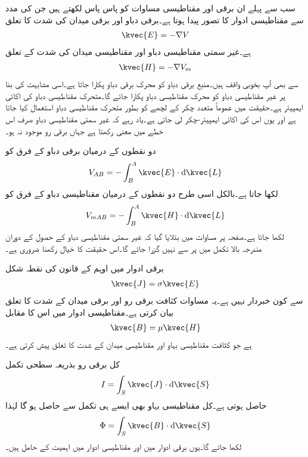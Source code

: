 سب سے پہلے ان برقی اور مقناطیسی مساوات کو پاس پاس لکھتے ہیں جن کی مدد سے مقناطیسی ادوار کا تصور پیدا ہوتا ہے۔برقی دباو اور برقی میدان کی شدت کا تعلق
\begin{align}
\kvec{E}=-\nabla V
\end{align}
ہے۔غیر سمتی مقناطیسی دباو اور مقناطیسی میدان کی شدت کے تعلق
\begin{align}
\kvec{H}=-\nabla V_m
\end{align}
سے بھی آپ بخوبی واقف ہیں۔منبع برقی دباو کو محرک برقی دباو پکارا جاتا ہے۔اسی مشابہت کی بنا پر غیر مقناطیسی  دباو کو محرک مقناطیسی دباو پکارا جائے گا۔متحرک مقناطیسی دباو کی اکائی ایمپیئر ہے۔حقیقت میں عموماً متعدد چکر کے لچھے کو بطور متحرک مقناطیسی دباو استعمال کیا جاتا ہے اور  یوں اس کی اکائی ایمپیئر-چکر لی جاتی ہے۔یاد رہے کہ غیر سمتی مقناطیسی دباو صرف اس خطے میں معنی رکھتا ہے جہاں برقی رو موجود نہ ہو۔

دو نقطوں کے درمیان برقی دباو کے فرق کو
\begin{align}
V_{AB}=-\int_B^A \kvec{E} \cdot \dif \kvec{L}
\end{align}
لکھا جاتا ہے۔بالکل اسی طرح دو نقطوں کے درمیان مقناطیسی دباو کے فرق کو
\begin{align}
V_{mAB}=-\int_B^A \kvec{H} \cdot \dif \kvec{L}
\end{align}
لکھا جاتا ہے۔صفحہ  پر مساوات  میں بتلایا گیا کہ غیر سمتی مقناطیسی دباو کے حصول کے دوران مندرجہ بالا تکمل میں  پر سے نہیں گزرا جائے گا۔اس حقیقت کا خیال رکھنا ضروری ہے۔ 

برقی ادوار میں اوہم  کے قانون کی نقطہ شکل
\begin{align}
\kvec{J}=\sigma \kvec{E}
\end{align}
سے کون خبردار نہیں ہے۔یہ مساوات کثافت برقی رو اور برقی میدان کے شدت کا تعلق بیان کرتی ہے۔مقناطیسی ادوار میں اس کا مقابل
\begin{align}
\kvec{B}=\mu \kvec{H}
\end{align}
ہے جو کثافت مقناطیسی بہاو اور مقناطیسی میدان کے شدت کا تعلق پیش کرتی ہے۔

کل برقی رو بذریعہ سطحی تکمل
\begin{align}
I=\int_S \kvec{J} \cdot \dif \kvec{S}
\end{align}
حاصل ہوتی ہے۔کل مقناطیسی بہاو  بھی ایسے ہی تکمل سے حاصل ہو گا لہٰذا
\begin{align}
\Phi=\int_S \kvec{B} \cdot \dif \kvec{S}
\end{align}
لکھا جائے گا۔یوں برقی ادوار میں  اور مقناطیسی ادوار میں  اہمیت کے حامل ہیں۔

